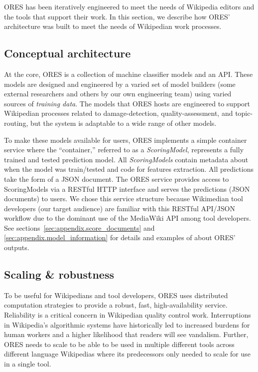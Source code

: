 
ORES has been iteratively engineered to meet the needs of Wikipedia editors and the tools that support their work.  In this section, we describe how ORES' architecture was built to meet the needs of Wikipedian work processes.

\subsection{Conceptual architecture}
At the core, ORES is a collection of machine classifier models and an API.  These models are designed and engineered by a varied set of model builders (some external researchers and others by our own engineering team) using varied sources of \emph{training data}.  The models that ORES hosts are engineered to support Wikipedian processes related to damage-detection, quality-assessment, and topic-routing, but the system is adaptable to a wide range of other models.

To make these models available for users, ORES implements a simple container service where the ``container,'' referred to as a \emph{ScoringModel}, represents a fully trained and tested prediction model.  All \emph{ScoringModels} contain metadata about when the model was train/tested and code for features extraction.  All predictions take the form of a JSON document.  The ORES service provides access to ScoringModels via a RESTful HTTP interface and serves the predictions (JSON documents) to users.  We chose this service structure because Wikimedian tool developers (our target audience) are familiar with this RESTful API/JSON workflow due to the dominant use of the MediaWiki API among tool developers.  See sections~\ref{sec:appendix.score_documents} and \ref{sec:appendix.model_information} for details and examples of about ORES' outputs.

\subsection{Scaling \& robustness}
To be useful for Wikipedians and tool developers, ORES uses distributed computation strategies to provide a robust, fast, high-availability service.  Reliability is a critical concern in Wikipedian quality control work.  Interruptions in Wikipedia's algorithmic systems have historically led to increased burdens for human workers and a higher likelihood that readers will see vandalism\cite{geiger2013levee}.  Further, ORES needs to scale to be able to be used in multiple different tools across different language Wikipedias where its predecessors only needed to scale for use in a single tool.

